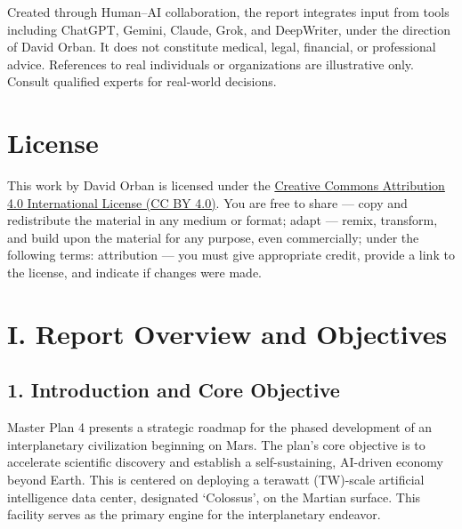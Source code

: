 \documentclass[fontsize=10pt, oneside, DIV=calc]{scrartcl}
\begin{document}
Created through Human–AI collaboration, the report integrates input from tools including ChatGPT, Gemini, Claude, Grok, and DeepWriter, under the direction of David Orban. It does not constitute medical, legal, financial, or professional advice. References to real individuals or organizations are illustrative only. Consult qualified experts for real-world decisions.

\section*{License}
\vspace{-1em}
This work by David Orban is licensed under the 
\href{https://creativecommons.org/licenses/by/4.0/}{Creative Commons Attribution 4.0 International License (CC BY 4.0)}. You are free to share — copy and redistribute the material in any medium or format; adapt — remix, transform, and build upon the material for any purpose, even commercially; under the following terms: attribution — you must give appropriate credit, provide a link to the license, and indicate if changes were made.
        
\newpage
\begingroup
\setcounter{tocdepth}{5}
\hypersetup{hidelinks}
\tableofcontents
\endgroup
\newpage

\section*{I. Report Overview and Objectives}



\subsection*{}

\subsection*{1. Introduction and Core Objective}



\medskip

\noindent
Master Plan 4 presents a strategic roadmap for the phased development of an interplanetary civilization beginning on Mars. The plan's core objective is to accelerate scientific discovery and establish a self-sustaining, AI-driven economy beyond Earth. This is centered on deploying a terawatt (TW)-scale artificial intelligence data center, designated `Colossus', on the Martian surface. This facility serves as the primary engine for the interplanetary endeavor.
\end{document}

